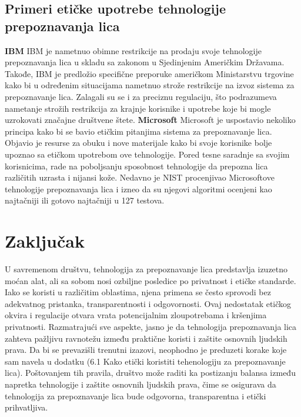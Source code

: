 \documentclass{article}
\begin{document}
\subsection{Primeri etičke upotrebe tehnologije prepoznavanja lica}
\textbf{IBM}
\newline
\newline
IBM je nametnuo obimne restrikcije na prodaju svoje tehnologije prepoznavanja lica u skladu sa zakonom u Sjedinjenim Američkim Državama. Takođe, IBM je predložio specifične preporuke američkom Ministarstvu trgovine kako bi u određenim situacijama nametnuo strože restrikcije na izvoz sistema za prepoznavanje lica.
\newline
\newline
Zalagali su se i za preciznu regulaciju, što podrazumeva nametanje strožih restrikcija za krajnje korisnike i upotrebe koje bi mogle uzrokovati značajne društvene štete.
\newline
\newline
\textbf{Microsoft}
\newline
\newline
Microsoft je uspostavio nekoliko principa kako bi se bavio etičkim pitanjima sistema za prepoznavanje lica. Objavio je resurse za obuku i nove materijale kako bi svoje korisnike bolje upoznao sa etičkom upotrebom ove tehnologije.
\newline
\newline
Pored tesne saradnje sa svojim korisnicima, rade na poboljsanju sposobnost tehnologije da prepozna lica različitih uzrasta i nijansi kože. Nedavno je NIST procenjivao Microsoftove tehnologije prepoznavanja lica i izneo da su njegovi algoritmi ocenjeni kao najtačniji ili gotovo najtačniji u 127 testova.

\newpage
\section{Zaključak}
U savremenom društvu, tehnologija za prepoznavanje lica predstavlja izuzetno moćan alat, ali sa sobom nosi ozbiljne posledice po privatnost i etičke standarde. Iako se koristi u različitim oblastima, njena primena se često sprovodi bez adekvatnog pristanka, transparentnosti i odgovornosti. Ovaj nedostatak etičkog okvira i regulacije otvara vrata potencijalnim zloupotrebama i kršenjima privatnosti.
\newline
\newline
Razmatrajući sve aspekte, jasno je da tehnologija prepoznavanja lica zahteva pažljivu ravnotežu između praktične koristi i zaštite osnovnih ljudskih prava. Da bi se prevazišli trenutni izazovi, neophodno je preduzeti korake koje sam navela u dodatku (6.1 Kako etički koristiti tehenologiju za prepoznavanje lica).
\newline
\newline
Poštovanjem tih pravila, društvo može raditi ka postizanju balansa između napretka tehnologije i zaštite osnovnih ljudskih prava, čime se osigurava da tehnologija za prepoznavanje lica bude odgovorna, transparentna i etički prihvatljiva.
\newpage
\end{document}
